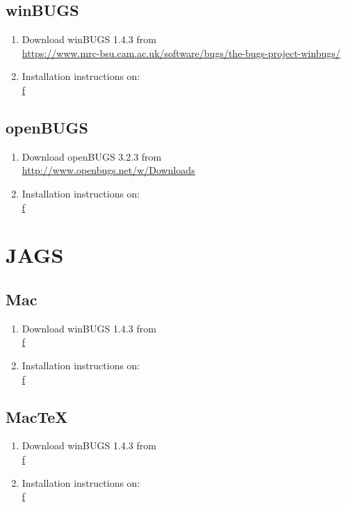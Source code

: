 

\subsection*{winBUGS }

	\begin{enumerate}
	\item Download winBUGS 1.4.3 from\\
	\href {https://www.mrc-bsu.cam.ac.uk/software/bugs/the-bugs-project-winbugs/}{https://www.mrc-bsu.cam.ac.uk/software/bugs/the-bugs-project-winbugs/}
	\item Installation instructions on: \\
	\href {f}{f}
	\end{enumerate}
\subsection*{openBUGS}
	\begin{enumerate}
	\item Download openBUGS 3.2.3 from\\
	\href {http://www.openbugs.net/w/Downloads}{http://www.openbugs.net/w/Downloads}
	\item Installation instructions on: \\
	\href {f}{f}
\end{enumerate}

\section*{JAGS}
\subsection*{Mac}

	\begin{enumerate}
	\item Download winBUGS 1.4.3 from\\
	\href {f}{f}
	\item Installation instructions on: \\
	\href {f}{f}
\end{enumerate}
\subsection*{MacTeX}
	\begin{enumerate}
	\item Download winBUGS 1.4.3 from\\
	\href {f}{f}
	\item Installation instructions on: \\
	\href {f}{f}
\end{enumerate}

